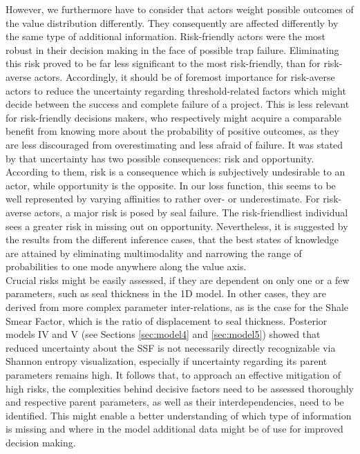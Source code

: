 	However, we furthermore have to consider that actors weight possible outcomes of the value distribution differently. They consequently are affected differently by the same type of additional information. Risk-friendly actors were the most robust in their decision making in the face of possible trap failure. Eliminating this risk proved to be far less significant to the most risk-friendly, than for risk-averse actors. Accordingly, it should be of foremost importance for risk-averse actors to reduce the uncertainty regarding threshold-related factors which might decide between the success and complete failure of a project. This is less relevant for risk-friendly decisions makers, who respectively might acquire a comparable benefit from knowing more about the probability of positive outcomes, as they are less discouraged from overestimating and less afraid of failure. It was stated by \citet{bratvold2010making} that uncertainty has two possible consequences: risk and opportunity. According to them, risk is a consequence which is subjectively undesirable to an actor, while opportunity is the opposite. In our loss function, this seems to be well represented by varying affinities to rather over- or underestimate. For risk-averse actors, a major risk is posed by seal failure. The risk-friendliest individual sees a greater risk in missing out on opportunity. Nevertheless, it is suggested by the results from the different inference cases, that the best states of knowledge are attained by eliminating multimodality and narrowing the range of probabilities to one mode anywhere along the value axis.\\
	Crucial risks might be easily assessed, if they are dependent on only one or a few parameters, such as seal thickness in the 1D model. In other cases, they are derived from more complex parameter inter-relations, as is the case for the Shale Smear Factor, which is the ratio of displacement to seal thickness. Posterior models IV and V (see Sections \ref{sec:model4} and \ref{sec:model5}) showed that reduced uncertainty about the SSF is not necessarily directly recognizable via Shannon entropy visualization, especially if uncertainty regarding its parent parameters remains high. It follows that, to approach an effective mitigation of high risks, the complexities behind decisive factors need to be assessed thoroughly and respective parent parameters, as well as their interdependencies, need to be identified. This might enable a better understanding of which type of information is missing and where in the model additional data might be of use for improved decision making.\\	
